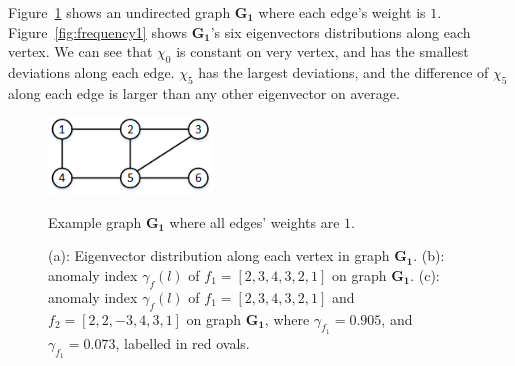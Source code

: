 \documentclass[twoside,leqno,twocolumn]{article}
\begin{document}
Figure~\ref{fig:graph_G} shows an undirected graph $\mathbf{G_1}$ where each edge's weight is $1$. Figure~\ref{fig:frequency1} shows  $\mathbf{G_1}$'s six eigenvectors distributions along each vertex. We can see that
$\chi_0$ is constant on very vertex, and has the smallest deviations along each edge. $\chi_5$ has the largest deviations, and the difference of $\chi_5$ along each edge is larger than any other eigenvector on average.

\begin{figure}[h]
	\centering
    {
		\includegraphics[height=0.8in] {figures/graph_G.png}
	}
    \vspace{-2mm}
	\caption{Example graph $\mathbf{G_1}$ where all edges' weights are $1$.}
	\label{fig:graph_G}
\end{figure}


\begin{figure}[ht]
	\centering
    \vspace{-3mm}
    \vspace{-3mm}
    \vspace{-2mm}

	\caption{(a): Eigenvector distribution along each vertex in graph $\mathbf{G_1}$.  (b): anomaly index $\gamma_f(l)$ of $f_1=[2,3,4,3,2,1]$ on graph $\mathbf{G_1}$. (c): anomaly index $\gamma_f(l)$ of $f_1=[2,3,4,3,2,1]$  and $f_2=[2,2,-3,4,3,1]$ on graph $\mathbf{G_1}$, where $\gamma_{f_1}=0.905$, and $\gamma_{f_1}=0.073$, labelled in red ovals.}
	\label{fig:f_on_g2}
\end{figure}
\end{document}
